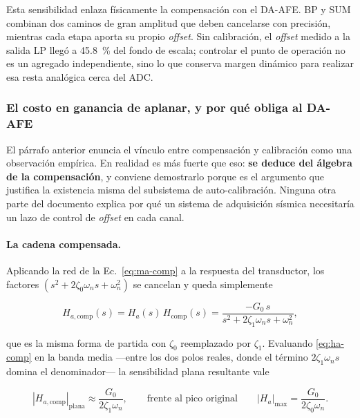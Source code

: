 Esta sensibilidad enlaza f\'isicamente la compensaci\'on con el DA-AFE. BP y SUM combinan
dos caminos de gran amplitud que deben cancelarse con precisi\'on, mientras cada etapa
aporta su propio \emph{offset}. Sin calibraci\'on, el \emph{offset} medido a la salida LP
lleg\'o a \SI{45.8}{\percent} del fondo de escala; controlar el punto de operaci\'on no es
un agregado independiente, sino lo que conserva margen din\'amico para realizar esa
resta anal\'ogica cerca del ADC.

\subsubsection{El costo en ganancia de aplanar, y por qu\'e obliga al DA-AFE}
\label{sec:costo-ganancia}

El p\'arrafo anterior enuncia el v\'inculo entre compensaci\'on y calibraci\'on como una
observaci\'on emp\'irica. En realidad es m\'as fuerte que eso: \textbf{se deduce del
\'algebra de la compensaci\'on}, y conviene demostrarlo porque es el argumento que
justifica la existencia misma del subsistema de auto-calibraci\'on. Ninguna otra parte del
documento explica por qu\'e un sistema de adquisici\'on s\'ismica necesitar\'ia un lazo de
control de \emph{offset} en cada canal.

\paragraph{La cadena compensada.} Aplicando la red de la Ec.~\eqref{eq:ma-comp} a la
respuesta del transductor, los factores $(s^2+2\zeta_0\omega_n s+\omega_n^2)$ se cancelan
y queda simplemente

\begin{equation}
H_{a,\mathrm{comp}}(s)=H_a(s)\,H_{\mathrm{comp}}(s)
=\frac{-G_0\,s}{s^{2}+2\zeta_1\omega_n s+\omega_n^{2}},
\label{eq:ha-comp}
\end{equation}

que es la misma forma de partida con $\zeta_0$ reemplazado por $\zeta_1$. Evaluando
\eqref{eq:ha-comp} en la banda media ---entre los dos polos reales, donde el t\'ermino
$2\zeta_1\omega_n s$ domina el denominador--- la sensibilidad plana resultante vale

\begin{equation}
|H_{a,\mathrm{comp}}|_{\text{plana}}\approx\frac{G_0}{2\zeta_1\omega_n},
\qquad\text{frente al pico original}\qquad
|H_a|_{\max}=\frac{G_0}{2\zeta_0\omega_n}.
\label{eq:sens-plana}
\end{equation}

